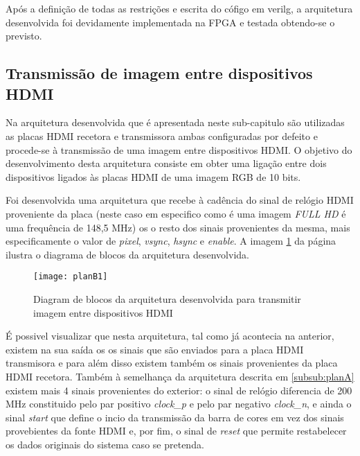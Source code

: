 Após a definição de todas as restrições e escrita do cófigo em verilg, a arquitetura desenvolvida foi devidamente implementada na FPGA e testada obtendo-se o previsto.

\subsection{Transmissão de imagem entre dispositivos HDMI} \label{subsub:planB}

Na arquitetura desenvolvida que é apresentada neste sub-capitulo são utilizadas as placas HDMI recetora e transmissora ambas configuradas por defeito e procede-se à transmissão de uma imagem entre dispositivos HDMI. O objetivo do desenvolvimento desta arquitetura consiste em obter uma ligação entre dois dispositivos ligados às placas HDMI de uma imagem RGB de 10 bits.

Foi desenvolvida uma arquitetura que recebe à cadência do sinal de relógio HDMI proveniente da placa (neste caso em especifico como é uma imagem \textit{FULL HD} é uma frequência de 148,5 MHz) os o resto dos sinais provenientes da mesma, mais especificamente o valor de \textit{pixel}, \textit{vsync}, \textit{hsync} e \textit{enable}. A imagem \ref{fig:planb1} da página \pageref{fig:planb1} ilustra o diagrama de blocos da arquitetura desenvolvida.

\begin{figure}[h!]
	\begin{center}
		\leavevmode
		\texttt{[image: planB1]}
		\caption{Diagram de blocos da arquitetura desenvolvida para transmitir imagem entre dispositivos HDMI}
		\label{fig:planb1}
	\end{center}
\end{figure}

É possivel visualizar que nesta arquitetura, tal como já acontecia na anterior, existem na sua saída os os sinais que são enviados para a placa HDMI transmisora e para além disso existem também os sinais provenientes da placa HDMI recetora. Também à semelhança da arquitetura descrita em \ref{subsub:planA} existem mais 4 sinais provenientes do exterior: o sinal de relógio diferencia de 200 MHz constituido pelo par positivo \textit{clock\_p} e pelo par negativo \textit{clock\_n}, e ainda o sinal \textit{start} que define o incio da transmissão da barra de cores em vez dos sinais provebientes da fonte HDMI e, por fim, o sinal de \textit{reset} que permite restabelecer os dados originais do sistema caso se pretenda.

